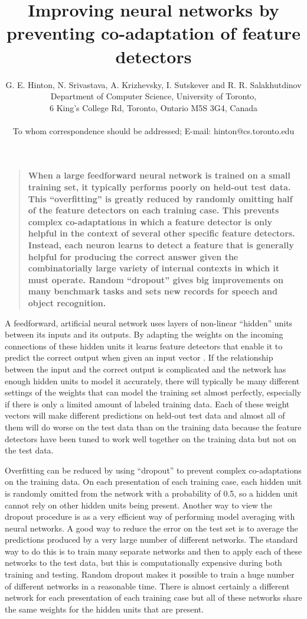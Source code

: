 \documentclass[12pt]{article}
\title{Improving neural networks by preventing co-adaptation of feature detectors}
\author{G. E. Hinton, N. Srivastava, A. Krizhevsky, I. Sutskever and R. R.  Salakhutdinov\\
\normalsize{Department of Computer Science, University of Toronto,}\\
\normalsize{6 King's College Rd, Toronto, Ontario M5S 3G4, Canada}\\
\\
\normalsize{To whom correspondence should be addressed; E-mail:  hinton@cs.toronto.edu}
}
\date{}
\newenvironment{sciabstract}{\begin{quote} \bf}
{\end{quote}}
\begin{document}
 





\maketitle 

\begin{sciabstract}
When a large feedforward neural network is trained on a small training set, it typically
performs poorly on held-out test data.  This ``overfitting'' is greatly reduced by
randomly omitting half of the feature detectors on each training case. This prevents
complex co-adaptations in which a feature detector is only helpful in the context of
several other specific feature detectors.  Instead, each neuron learns to detect a feature
that is generally helpful for producing the correct answer given the combinatorially large
variety of internal contexts in which it must operate. Random ``dropout'' gives big
improvements on many benchmark tasks and sets new records for speech and object
recognition.
\end{sciabstract}

A feedforward, artificial neural network uses layers of non-linear ``hidden''
units between its inputs and its outputs. By adapting the weights on the incoming
connections of these hidden units it learns feature detectors that enable it to predict
the correct output when given an input vector \cite{RHW}.  If the relationship between the
input and the correct output is complicated and the network has enough hidden units to
model it accurately, there will typically be many different settings of the weights that
can model the training set almost perfectly, especially if there is only a limited amount of
labeled training data.  Each of these weight vectors will make different predictions on
held-out test data and almost all of them will do worse on the test data than on the training
data because the feature detectors have been tuned to work well together on the training
data but not on the test data. 

Overfitting can be reduced by using ``dropout'' to prevent complex co-adaptations on the
training data. On each presentation of each training case, each hidden unit is randomly
omitted from the network with a probability of 0.5, so a hidden unit cannot rely on other
hidden units being present. Another way to view the dropout procedure is as a very
efficient way of performing model averaging with neural networks. A good way to reduce the
error on the test set is to average the predictions produced by a very large number of
different networks.  The standard way to do this is to train many separate networks and
then to apply each of these networks to the test data, but this is computationally
expensive during both training and testing.  Random dropout makes it possible to train a
huge number of different networks in a reasonable time. There is almost certainly a
different network for each presentation of each training case but all of these networks
share the same weights for the hidden units that are present.
\end{document}
